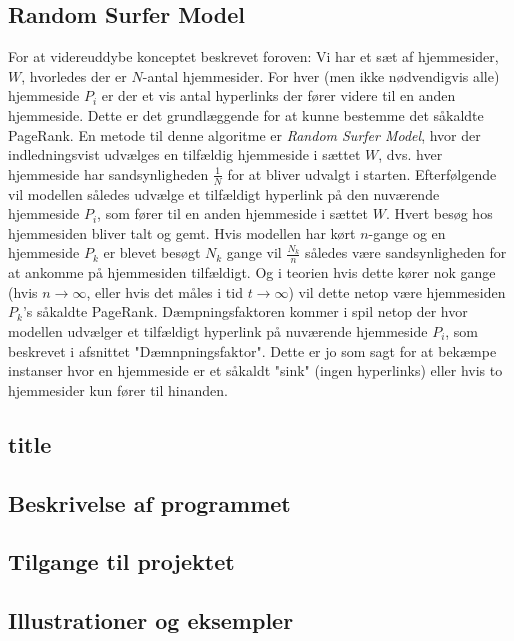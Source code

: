 \subsection*{Random Surfer Model}
For at videreuddybe konceptet beskrevet foroven: Vi har et sæt af hjemmesider, $W$, hvorledes der er $N$-antal hjemmesider. For hver (men ikke nødvendigvis alle) hjemmeside $P_i$ er der et vis antal hyperlinks der fører videre til en anden hjemmeside. Dette er det grundlæggende for at kunne bestemme det såkaldte PageRank. En metode til denne algoritme er \emph{Random Surfer Model}, hvor der indledningsvist udvælges en tilfældig hjemmeside i sættet $W$, dvs. hver hjemmeside har sandsynligheden $\frac{1}{N}$ for at bliver udvalgt i starten. Efterfølgende vil modellen således udvælge et tilfældigt hyperlink på den nuværende hjemmeside $P_i$, som fører til en anden hjemmeside i sættet $W$. Hvert besøg hos hjemmesiden bliver talt og gemt. Hvis modellen har kørt $n$-gange og en hjemmeside $P_k$ er blevet besøgt $N_k$ gange vil $\frac{N_k}{n}$ således være sandsynligheden for at ankomme på hjemmesiden tilfældigt. Og i teorien hvis dette kører nok gange (hvis $n \rightarrow \infty$, eller hvis det måles i tid $t \rightarrow \infty$) vil dette netop være hjemmesiden $P_k$'s såkaldte PageRank. Dæmpningsfaktoren kommer i spil netop der hvor modellen udvælger et tilfældigt hyperlink på nuværende hjemmeside $P_i$, som beskrevet i afsnittet "Dæmnpningsfaktor". Dette er jo som sagt for at bekæmpe instanser hvor en hjemmeside er et såkaldt "sink" (ingen hyperlinks) eller hvis to hjemmesider kun fører til hinanden.


\subsection*{title}

\subsection*{Beskrivelse af programmet}

\subsection*{Tilgange til projektet}

\subsection*{Illustrationer og eksempler}